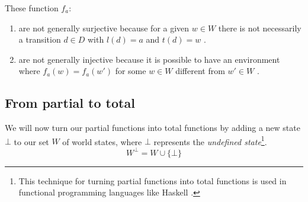 These function $f_{a}$:
\begin{enumerate}[(1)]
    \item are not generally surjective because for a given $w \in W$ there is not necessarily a transition $d \in D$ with $l(d) = a$ and $t(d) = w$ .

    \item are not generally injective because it is possible to have an environment where $f_{a}(w)=f_{a}(w')$ for some $w \in W$ different from $w' \in W$ .
\end{enumerate}


\subsection{From partial to total}

We will now turn our partial functions into total functions by adding a new state $\bot$ to our set $W$ of world states, where $\bot$ represents the \emph{undefined state}\footnote{
    This technique for turning partial functions into total functions is used in functional programming languages like Haskell .
}.
\begin{equation}
    W^{\bot} = W \cup \{ \bot \}
\end{equation}

